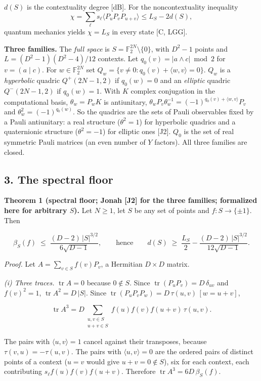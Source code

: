 \documentclass[11pt,a4paper]{article}
\begin{document}
\(d(S)\) is the contextuality degree {[}dB{]}. For the noncontextuality inequality
\[\chi = \sum_\ell s_\ell \langle P_u P_v P_{u+v}\rangle \le L_S - 2 d(S),\]
quantum mechanics yields \(\chi = L_S\) in every state {[}C, LGG{]}.

\textbf{Three families.} The \emph{full space} is \(S = \mathbb{F}_2^{2N}\setminus\{0\}\), with \(D^2-1\) points
and \(L = (D^2-1)(D^2-4)/12\) contexts. Let \(q_0(v)=|a\wedge c|\bmod2\) for \(v=(a\mid c)\).
For \(w\in\mathbb{F}_2^{2N}\) set \(Q_w=\{v\ne0:q_0(v)+\langle w,v\rangle=0\}\).
\(Q_w\) is a \emph{hyperbolic} quadric \(Q^+(2N-1,2)\) if \(q_0(w)=0\) and an \emph{elliptic} quadric
\(Q^-(2N-1,2)\) if \(q_0(w)=1\). With \(K\) complex conjugation in the computational basis,
\(\theta_w=P_wK\) is antiunitary, \(\theta_wP_v\theta_w^{-1}=(-1)^{q_0(v)+\langle w,v\rangle}P_v\)
and \(\theta_w^2=(-1)^{q_0(w)}\). So the quadrics are the sets of Pauli observables fixed by a Pauli
antiunitary: a real structure (\(\theta^2 = 1\)) for hyperbolic quadrics and a quaternionic structure
(\(\theta^2 = -1\)) for elliptic ones {[}J2{]}. \(Q_0\) is the set of real symmetric Pauli matrices (an even
number of \(Y\) factors). All three families are closed.

\subsection{3. The spectral floor}\label{3-the-spectral-floor}

\textbf{Theorem 1 (spectral floor; Jonah {[}J2{]} for the three families; formalized here for arbitrary \(S\)).}
Let \(N \ge 1\), let \(S\) be any set of points and \(f : S \to \{\pm 1\}\). Then

\[\beta_S(f) \;\le\; \frac{(D-2)\,|S|^{3/2}}{6\sqrt{D-1}},
\qquad\text{hence}\qquad
d(S) \;\ge\; \frac{L_S}{2} - \frac{(D-2)\,|S|^{3/2}}{12\sqrt{D-1}} .\]

\emph{Proof.} Let \(A = \sum_{v \in S} f(v) P_v\), a Hermitian \(D \times D\) matrix.

\emph{(i) Three traces.} \(\operatorname{tr} A = 0\) because \(0 \notin S\). Since
\(\operatorname{tr}(P_u P_v) = D\,\delta_{uv}\) and \(f(v)^2 = 1\), \(\operatorname{tr} A^2 = D\,|S|\). Since
\(\operatorname{tr}(P_u P_v P_w) = D\,\tau(u,v)\,[w = u+v]\),

\[\operatorname{tr} A^3 = D \sum_{\substack{u, v \in S \\ u+v \in S}} f(u) f(v) f(u+v)\, \tau(u,v).\]

The pairs with \(\langle u,v\rangle = 1\) cancel against their transposes, because \(\tau(v,u) = -\tau(u,v)\).
The pairs with \(\langle u,v \rangle = 0\) are the ordered pairs of distinct points of a context
(\(u = v\) would give \(u + v = 0 \notin S\)), six for each context, each contributing \(s_\ell f(u)f(v)f(u+v)\).
Therefore \(\operatorname{tr} A^3 = 6 D\, \beta_S(f)\).
\end{document}
